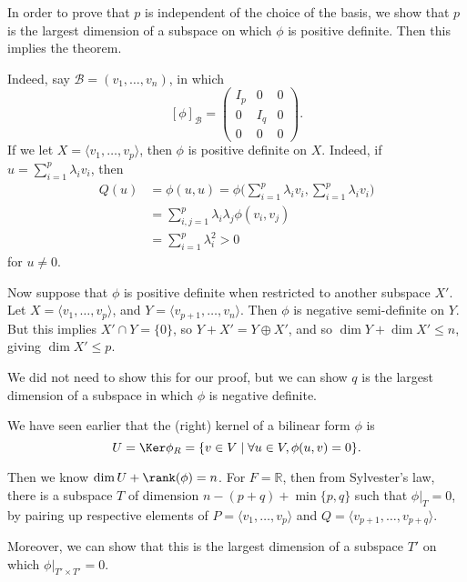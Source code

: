 \documentclass[12pt]{article}
\begin{document}
\begin{proofbox}
	In order to prove that $p$ is independent of the choice of the basis, we show that $p$ is the largest dimension of a subspace on which $\phi$ is positive definite. Then this implies the theorem.

	Indeed, say $\mathcal{B} = (v_1, \ldots, v_n)$, in which
	\[
		[\phi]_{\mathcal{B}} =
		\begin{pmatrix}
			I_p & 0 & 0\\
			   0 & I_q & 0 \\
			0 & 0 & 0
		\end{pmatrix}.
	\]
	If we let $X = \langle v_1, \ldots, v_p \rangle$, then $\phi$ is positive definite on $X$. Indeed, if $u = \sum_{i = 1}^{p} \lambda_i v_i$, then
	\begin{align*}
		Q(u) &= \phi(u, u) = \phi \Biggl( \sum_{i = 1}^{p} \lambda_i v_i, \sum_{i = 1}^{p} \lambda_i v_i \Biggr) \\
		     &= \sum_{i,j = 1}^{p} \lambda_i \lambda_j \phi(v_i, v_j) \\
		     &= \sum_{i = 1}^{p} \lambda_i^2 > 0
	\end{align*}
	for $u \neq 0$.

	Now suppose that $\phi$ is positive definite when restricted to another subspace $X'$. Let $X = \langle v_1, \ldots, v_p \rangle$, and $Y = \langle v_{p+1}, \ldots, v_n \rangle$. Then $\phi$ is negative semi-definite on $Y$. But this implies $X' \cap Y = \{0\}$, so $Y + X' = Y \oplus X'$, and so $\dim Y + \dim X' \leq n$, giving $\dim X' \leq p$.
\end{proofbox}

\begin{remark}
	We did not need to show this for our proof, but we can show $q$ is the largest dimension of a subspace in which $\phi$ is negative definite.
\end{remark}

We have seen earlier that the (right) kernel of a bilinear form $\phi$ is
\[
	U = \Ker \phi_R = \{v \in V \mid \forall u \in V, \phi(u, v) = 0\}
.\]

Then we know $\dim U + \rank(\phi) = n$. For $F = \mathbb{R}$, then from Sylvester's law, there is a subspace $T$ of dimension $n - (p+q) + \min \{p, q\}$ such that $\phi|_T = 0$, by pairing up respective elements of $P = \langle v_1, \ldots, v_p \rangle$ and $Q = \langle v_{p+1}, \ldots, v_{p+q} \rangle$.

Moreover, we can show that this is the largest dimension of a subspace $T'$ on which $\phi|_{T' \times T'} = 0$.
\end{document}
